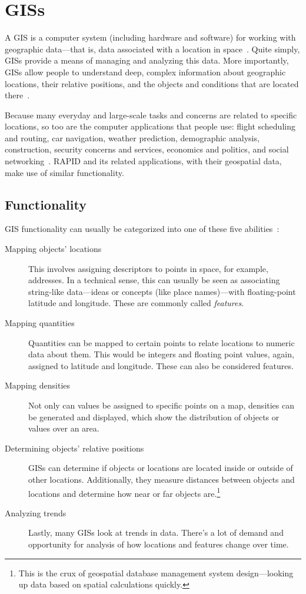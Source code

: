 \section{GISs}
A GIS is a computer system (including hardware and software) for working with geographic data---that is, data associated with a location in space~\cite{Esriintro}. Quite simply, GISs provide a means of managing and analyzing this data. More importantly, GISs allow people to understand deep, complex information about geographic locations, their relative positions, and the objects and conditions that are located there~\cite{Esriintro}.

Because many everyday and large-scale tasks and concerns are related to specific locations, so too are the computer applications that people use: flight scheduling and routing, car navigation, weather prediction, demographic analysis, construction, security concerns and services, economics and politics, and social networking~\cite{Esriintro}. RAPID and its related applications, with their geospatial data, make use of similar functionality.

\subsection{Functionality}
GIS functionality can usually be categorized into one of these five abilities~\cite{Esriintro}:

\begin{description}
  \item[Mapping objects' locations] This involves assigning descriptors to points in space, for example, addresses. In a technical sense, this can usually be seen as associating string-like data---ideas or concepts (like place names)---with floating-point latitude and longitude. These are commonly called \textit{features}.
  \item[Mapping quantities] Quantities can be mapped to certain points to relate locations to numeric data about them. This would be integers and floating point values, again, assigned to latitude and longitude. These can also be considered features.
  \item[Mapping densities] Not only can values be assigned to specific points on a map, densities can be generated and displayed, which show the distribution of objects or values over an area.
  \item[Determining objects' relative positions] GISs can determine if objects or locations are located inside or outside of other locations. Additionally, they measure distances between objects and locations and determine how near or far objects are.\footnote{This is the crux of geospatial database management system design---looking up data based on spatial calculations quickly.}
  \item[Analyzing trends] Lastly, many GISs look at trends in data. There's a lot of demand and opportunity for analysis of how locations and features change over time.
\end{description}

